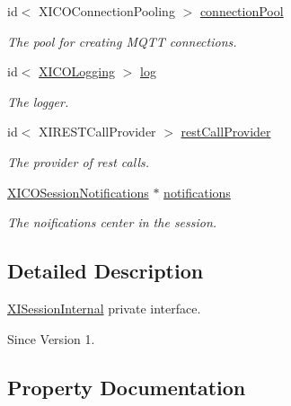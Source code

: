 \begin{DoxyCompactItemize}
id$<$ X\+I\+C\+O\+Connection\+Pooling $>$ \hyperlink{category_x_i_session_internal_07_08_adc8bea01e6c36e7e28e5c68c028c4b5d}{connection\+Pool}
\begin{DoxyCompactList}\small\item\em The pool for creating M\+Q\+TT connections. \end{DoxyCompactList}\item 
id$<$ \hyperlink{protocol_x_i_c_o_logging-p}{X\+I\+C\+O\+Logging} $>$ \hyperlink{category_x_i_session_internal_07_08_aec666be425dd3c45da3bac34d87d5e1b}{log}
\begin{DoxyCompactList}\small\item\em The logger. \end{DoxyCompactList}\item 
id$<$ X\+I\+R\+E\+S\+T\+Call\+Provider $>$ \hyperlink{category_x_i_session_internal_07_08_a82a93ab90616ebd6c9ecf7afec360626}{rest\+Call\+Provider}
\begin{DoxyCompactList}\small\item\em The provider of rest calls. \end{DoxyCompactList}\item 
\hyperlink{interface_x_i_c_o_session_notifications}{X\+I\+C\+O\+Session\+Notifications} $\ast$ \hyperlink{category_x_i_session_internal_07_08_acea05d51d24a4832ad5d4466d4ded648}{notifications}
\begin{DoxyCompactList}\small\item\em The noifications center in the session. \end{DoxyCompactList}\end{DoxyCompactItemize}


\subsection{Detailed Description}
\hyperlink{interface_x_i_session_internal}{X\+I\+Session\+Internal} private interface. 

\begin{DoxySince}{Since}
Version 1. 
\end{DoxySince}


\subsection{Property Documentation}
\hypertarget{category_x_i_session_internal_07_08_aed4f95ad415dba8b614f31fd2de6b213}{}\label{category_x_i_session_internal_07_08_aed4f95ad415dba8b614f31fd2de6b213} 
